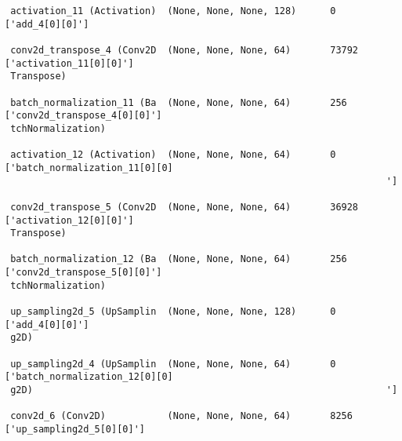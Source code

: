 \documentclass[
  letterpaper,
  DIV=11,
  numbers=noendperiod]{scrreprt}
\begin{document}
\begin{verbatim}
 activation_11 (Activation)  (None, None, None, 128)      0         ['add_4[0][0]']               
                                                                                                  
 conv2d_transpose_4 (Conv2D  (None, None, None, 64)       73792     ['activation_11[0][0]']       
 Transpose)                                                                                       
                                                                                                  
 batch_normalization_11 (Ba  (None, None, None, 64)       256       ['conv2d_transpose_4[0][0]']  
 tchNormalization)                                                                                
                                                                                                  
 activation_12 (Activation)  (None, None, None, 64)       0         ['batch_normalization_11[0][0]
                                                                    ']                            
                                                                                                  
 conv2d_transpose_5 (Conv2D  (None, None, None, 64)       36928     ['activation_12[0][0]']       
 Transpose)                                                                                       
                                                                                                  
 batch_normalization_12 (Ba  (None, None, None, 64)       256       ['conv2d_transpose_5[0][0]']  
 tchNormalization)                                                                                
                                                                                                  
 up_sampling2d_5 (UpSamplin  (None, None, None, 128)      0         ['add_4[0][0]']               
 g2D)                                                                                             
                                                                                                  
 up_sampling2d_4 (UpSamplin  (None, None, None, 64)       0         ['batch_normalization_12[0][0]
 g2D)                                                               ']                            
                                                                                                  
 conv2d_6 (Conv2D)           (None, None, None, 64)       8256      ['up_sampling2d_5[0][0]']     
                                                                                                  

\end{verbatim}
\end{document}
